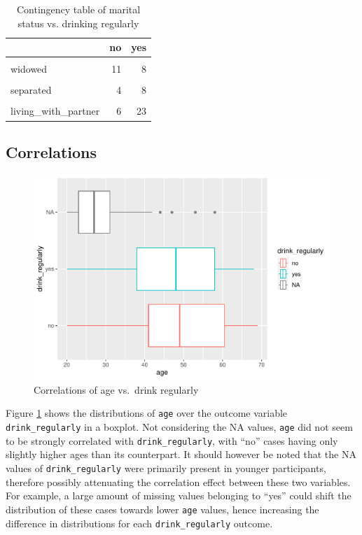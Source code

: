 \documentclass[
]{article}
\begin{document}
\begin{table}[!h]

\caption{\label{tab:cont-marital}Contingency table of marital status vs. drinking regularly}
\centering
\begin{tabular}[t]{lrr}
\toprule
  & no & yes\\
\midrule
\cellcolor{gray!6}{married} & \cellcolor{gray!6}{81} & \cellcolor{gray!6}{175}\\
widowed & 11 & 8\\
\cellcolor{gray!6}{divorced} & \cellcolor{gray!6}{14} & \cellcolor{gray!6}{48}\\
separated & 4 & 8\\
\cellcolor{gray!6}{never\_married} & \cellcolor{gray!6}{23} & \cellcolor{gray!6}{45}\\
\addlinespace
living\_with\_partner & 6 & 23\\
\bottomrule
\end{tabular}
\end{table}

\hypertarget{correlations}{%
\subsection{Correlations}\label{correlations}}

\begin{figure}
\centering
\includegraphics{report_files/figure-latex/box-age-1.pdf}
\caption{\label{fig:box-age}Correlations of age vs.~drink regularly}
\end{figure}

Figure \ref{fig:box-age} shows the distributions of \texttt{age} over the outcome variable \texttt{drink\_regularly} in a boxplot. Not considering the NA values, \texttt{age} did not seem to be strongly correlated with \texttt{drink\_regularly}, with ``no'' cases having only slightly higher ages than its counterpart. It should however be noted that the NA values of \texttt{drink\_regularly} were primarily present in younger participants, therefore possibly attenuating the correlation effect between these two variables. For example, a large amount of missing values belonging to ``yes'' could shift the distribution of these cases towards lower \texttt{age} values, hence increasing the difference in distributions for each \texttt{drink\_regularly} outcome.
\end{document}
